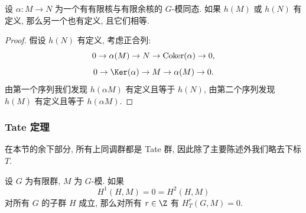 \begin{corollary}\label{cor:ii.3.9}
设 $\alpha\colon M\to N$ 为一个有有限核与有限余核的 $G$-模同态. 如果 $h(M)$ 或 $h(N)$ 有定义, 那么另一个也有定义, 且它们相等.
\end{corollary}

\begin{proof}
假设 $h(N)$ 有定义, 考虑正合列:
\[
 0\to \alpha(M)\to N\to \operatorname{Coker}(\alpha)\to 0,
\]
\[
 0\to \Ker(\alpha)\to M\to \alpha(M)\to 0.
\]
由第一个序列我们发现 $h(\alpha M)$ 有定义且等于 $h(N)$, 由第二个序列发现 $h(M)$ 有定义且等于 $h(\alpha M)$.
\end{proof}

\subsubsection*{Tate 定理}

在本节的余下部分, 所有上同调群都是 Tate 群, 因此除了主要陈述外我们略去下标 $T$.

\begin{theorem}\label{thm:ii.3.10}
设 $G$ 为有限群, $M$ 为 $G$-模. 如果
\[
 H^1(H,M)=0=H^2(H,M)
\]
对所有 $G$ 的子群 $H$ 成立, 那么对所有 $r\in\Z$ 有 $H_T^r(G,M)=0$.
\end{theorem}

